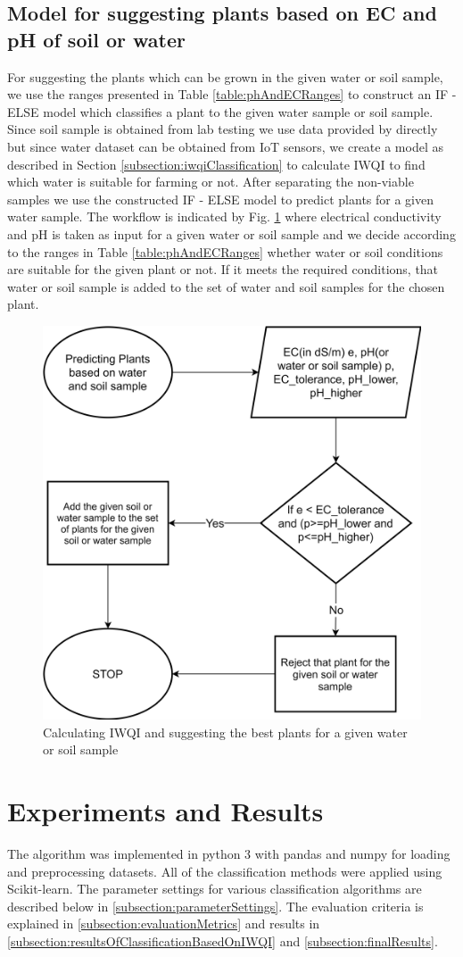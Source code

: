 \subsection{Model for suggesting plants based on EC and pH of soil or water}
\label{subsection:plantSelection}
For suggesting the plants which can be grown in the given water or soil sample, we use the ranges presented in Table \ref{table:phAndECRanges} to construct an IF - ELSE model which classifies a plant to the given water sample or soil sample. Since soil sample is obtained from lab testing we use data provided by \cite{dataset:lucas} directly but since water dataset can be obtained from IoT sensors, we create a model as described in Section \ref{subsection:iwqiClassification} to calculate IWQI to find which water is suitable for farming or not. After separating the non-viable samples we use the constructed IF - ELSE model to predict plants for a given water sample. 
The workflow is indicated by Fig. \ref{fig:phAndECRanges} where electrical conductivity and pH is taken as input for a given water or soil sample and we decide according to the ranges in Table \ref{table:phAndECRanges} whether water or soil conditions are suitable for the given plant or not. If it meets the required conditions, that water or soil sample is added to the set of water and soil samples for the chosen plant.

\begin{figure}[H]
\includegraphics[width=0.49\linewidth]{Model for suggesting plants.png}
\centering
\caption{Calculating IWQI and suggesting the best plants for a given water or soil sample}
\label{fig:phAndECRanges}
\end{figure}

\section{Experiments and Results}
\label{section:expAndRes}
The algorithm was implemented in python 3 with pandas and numpy for loading and preprocessing datasets. All of the classification methods were applied using Scikit-learn\cite{article:scikit-learn}. The parameter settings for various classification algorithms are described below in \ref{subsection:parameterSettings}. The evaluation criteria is explained in \ref{subsection:evaluationMetrics} and results in \ref{subsection:resultsOfClassificationBasedOnIWQI} and \ref{subsection:finalResults}. 

